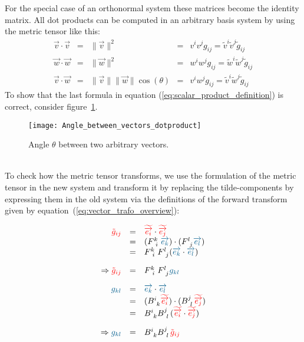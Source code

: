 For the special case of an orthonormal system these matrices become the identity matrix.
All dot products can be computed in an arbitrary basis system by using the metric tensor
like this:
\begin{equation}
    \label{eq:scalar_product_definition}
    \begin{array}{rclrcl}
        \vec{v} \cdot \vec{v} & = & \|\vec{v}\|^2 & = & v^i v^j g_{ij} = \tilde{v}^i \tilde{v}^j \tilde{g}_{ij} \\
        \vec{w} \cdot \vec{w} & = & \|\vec{w}\|^2 & = & w^i w^j g_{ij} = \tilde{w}^i \tilde{w}^j \tilde{g}_{ij} \\
        \vec{v} \cdot \vec{w} & = & \|\vec{v}\|  \|\vec{w}\| \cos(\theta) & = & v^i w^j g_{ij}  = \tilde{v}^i \tilde{w}^j \tilde{g}_{ij}
    \end{array}
\end{equation}
To show that the last formula in equation (\ref{eq:scalar_product_definition}) is correct,
consider figure~\ref{fig:angle_between_arbitrary_vectors}.
\begin{figure}[h]
    \centering
    \texttt{[image: Angle\_between\_vectors\_dotproduct]}
    \caption{Angle $\theta$ between two arbitrary vectors.}
    \label{fig:angle_between_arbitrary_vectors}
\end{figure} \\

To check how the metric tensor transforms, we use the formulation of the metric tensor in
the new system and transform it by replacing the tilde-components by expressing them in
the old system via the definitions of the forward transform given by
equation~(\ref{eq:vector_trafo_overview}):

\begin{equation}
    \begin{array}{rcl}
        \textcolor{red}{\tilde{g}_{ij}} & = & \hdbtv{i} \cdot \hdbtv{j} \\
                       & = & (F^{k~}_{~i}\hdbv{k}) \cdot (F^{l~}_{~j}\hdbv{l}) \\
                       & = & F^{k~}_{~i}  F^{l~}_{~j} (\hdbv{k} \cdot \hdbv{l}) \\
                       \noalign{\vskip10pt}
        \Rightarrow\textcolor{red}{\tilde{g}_{ij}} & = &
        F^{k~}_{~i}  F^{l~}_{~j} \textcolor{MidnightBlue}{{g}_{kl}} \\
        \noalign{\vskip10pt}
        \textcolor{MidnightBlue}{g_{kl}} & = & \hdbv{k} \cdot \hdbv{l} \\
        & = & (B^{i~}_{~k}\hdbtv{i}) \cdot (B^{j~}_{~l}\hdbtv{j}) \\
        & = & B^{i~}_{~k} B^{j~}_{~l} (\hdbtv{i} \cdot \hdbtv{j}) \\
        \noalign{\vskip10pt}
        \Rightarrow \textcolor{MidnightBlue}{g_{kl}} & = &
        B^{i~}_{~k} B^{j~}_{~l} \textcolor{red}{\tilde{g}_{ij}}
    \end{array}
\end{equation} \\

